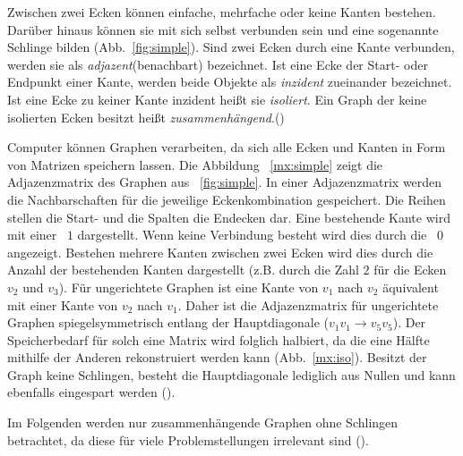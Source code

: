 Zwischen zwei Ecken können einfache, mehrfache oder keine Kanten bestehen.
Darüber hinaus können sie mit sich selbst verbunden sein und eine sogenannte Schlinge bilden (Abb.~\ref{fig:simple}).
Sind zwei Ecken durch eine Kante verbunden, werden sie als \textit{adjazent}(benachbart) bezeichnet.
Ist eine Ecke der Start- oder Endpunkt einer Kante, werden beide Objekte als \textit{inzident} zueinander bezeichnet.
Ist eine Ecke zu keiner Kante inzident heißt sie \textit{isoliert}.
Ein Graph der keine isolierten Ecken besitzt heißt \textit{zusammenhängend}.(\cite[4\psq]{theory}) \par

Computer können Graphen verarbeiten, da sich alle Ecken und Kanten in Form von Matrizen speichern lassen.
Die Abbildung ~\ref{mx:simple} zeigt die Adjazenzmatrix des Graphen aus ~\ref{fig:simple}.
In einer Adjazenzmatrix werden die Nachbarschaften für die jeweilige Eckenkombination gespeichert.
Die Reihen stellen die Start- und die Spalten die Endecken dar.
Eine bestehende Kante wird mit einer ~$1$ dargestellt. Wenn keine Verbindung besteht wird dies durch die ~$0$ angezeigt.
Bestehen mehrere Kanten zwischen zwei Ecken wird dies durch die Anzahl der bestehenden Kanten dargestellt (z.B. durch die Zahl $2$ für die Ecken $v_{2}$ und $v_{3}$).
Für ungerichtete Graphen ist eine Kante von $v_{1}$ nach $v_{2}$ äquivalent mit einer Kante von $v_{2}$ nach $v_{1}$.
Daher ist die Adjazenzmatrix für ungerichtete Graphen spiegelsymmetrisch entlang der Hauptdiagonale ($v_{1}v_{1} \rightarrow v_{5}v_{5}$).
Der Speicherbedarf für solch eine Matrix wird folglich halbiert, da die eine Hälfte mithilfe der Anderen rekonstruiert werden kann (Abb.~\ref{mx:iso}).
Besitzt der Graph keine Schlingen, besteht die Hauptdiagonale lediglich aus Nullen und kann ebenfalls eingespart werden (\cite[19]{algorithms}).

Im Folgenden werden nur zusammenhängende Graphen ohne Schlingen betrachtet, da diese für viele Problemstellungen irrelevant sind (\cite[4\psq]{theory}).

